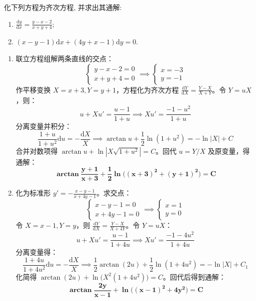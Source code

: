 \documentclass[lang=cn,11pt]{elegantbook}
\begin{document}
\begin{exercise}[求解方程]
化下列方程为齐次方程, 并求出其通解:
\begin{enumerate}
    \item[(1)] $\displaystyle \frac{\mathrm{d}y}{\mathrm{d}x}=\frac{y-x-2}{x+y+4}$;
    \item[(2)] $\displaystyle (x-y-1)\mathrm{d}x+(4y+x-1)\mathrm{d}y=0$.
\end{enumerate}
\end{exercise}
\begin{solution}
\begin{enumerate}
    \item[(1)] 联立方程组解两条直线的交点：
    \[
    \begin{cases} y-x-2=0 \\ x+y+4=0 \end{cases} \implies \begin{cases} x=-3 \\ y=-1 \end{cases}
    \]
    作平移变换 $X=x+3, Y=y+1$，方程化为齐次方程 $\displaystyle\frac{\mathrm{d}Y}{\mathrm{d}X} = \frac{Y-X}{X+Y}$。令 $Y=uX$，则：
    \[
    u+Xu' = \frac{u-1}{1+u} \implies Xu' = \frac{-1-u^2}{1+u}
    \]
    分离变量并积分：
    \[
    \frac{1+u}{1+u^2}\mathrm{d}u = -\frac{\mathrm{d}X}{X} \implies \arctan u + \frac{1}{2}\ln(1+u^2) = -\ln|X| + C
    \]
    合并对数项得 $\arctan u + \ln|X\sqrt{1+u^2}| = C$。回代 $u=Y/X$ 及原变量，得通解：
    \[
    \mathbf{\arctan\frac{y+1}{x+3} + \frac{1}{2}\ln\big((x+3)^2+(y+1)^2\big) = C}
    \]
    
    \item[(2)] 化为标准形 $y' = -\frac{x-y-1}{x+4y-1}$。求交点：
    \[
    \begin{cases} x-y-1=0 \\ x+4y-1=0 \end{cases} \implies \begin{cases} x=1 \\ y=0 \end{cases}
    \]
    令 $X=x-1, Y=y$，则 $\displaystyle\frac{\mathrm{d}Y}{\mathrm{d}X} = \frac{Y-X}{X+4Y}$。令 $Y=uX$：
    \[
    u+Xu' = \frac{u-1}{1+4u} \implies Xu' = \frac{-1-4u^2}{1+4u}
    \]
    分离变量得：
    \[
    \frac{1+4u}{1+4u^2}\mathrm{d}u = -\frac{\mathrm{d}X}{X} \implies \frac{1}{2}\arctan(2u) + \frac{1}{2}\ln(1+4u^2) = -\ln|X| + C_1
    \]
    化简得 $\arctan(2u) + \ln\big(X^2(1+4u^2)\big) = C$。回代后得到通解：
    \[
    \mathbf{\arctan\frac{2y}{x-1} + \ln\big((x-1)^2+4y^2\big) = C}
    \]
\end{enumerate}
\end{solution}
\end{document}
